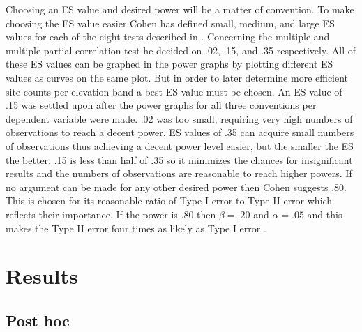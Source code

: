 Choosing an ES value and desired power will be a matter of convention.
To make choosing the ES value easier Cohen has defined small, medium, and large ES values for each of the eight tests described in \citet{cohen1992power}.
Concerning the multiple and multiple partial correlation test he decided on .02, .15, and .35 respectively.
All of these ES values can be graphed in the power graphs by plotting different ES values as curves on the same plot.
But in order to later determine more efficient site counts per elevation band a best ES value must be chosen.
An ES value of .15 was settled upon after the power graphs for all three conventions per dependent variable were made.
.02 was too small, requiring very high numbers of observations to reach a decent power.
ES values of .35 can acquire small numbers of observations thus achieving a decent power level easier, but the smaller the ES the better.
.15 is less than half of .35 so it minimizes the chances for insignificant results and the numbers of observations are reasonable to reach higher powers.
If no argument can be made for any other desired power then Cohen suggests .80.
This is chosen for its reasonable ratio of Type I error to Type II error which reflects their importance.
If the power is .80 then $\beta=.20$ and $\alpha=.05$ and this makes the Type II error four times as likely as Type I error \citep{cohen1992statistical}.

\section{Results}

\subsection{Post hoc}\label{sec:posthoc}

















